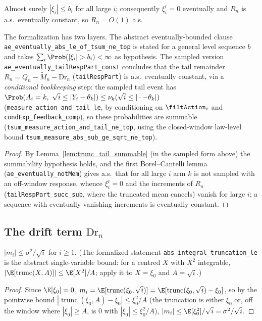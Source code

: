 \begin{lemma}\label{lem:trunc_tail_const}
\leanok
{}
Almost surely $|\xi_i|\le b_i$ for all large $i$; consequently $\xi_i^{\mathrm r}=0$ eventually and
$R_n$ is a.s.\ eventually constant, so $R_n=O(1)$ a.s.

The formalization has two layers. The abstract eventually-bounded clause
\texttt{ae\_eventually\_abs\_le\_of\_tsum\_ne\_top} is stated for a general level sequence $b$ and
takes $\sum_i\Prob(|\xi_i|>b_i)<\infty$ as hypothesis. The sampled version
\texttt{ae\_eventually\_tailRespPart\_const} concludes that the tail remainder
$R_n=Q_n-\tilde M_n-\mathrm{Dr}_n$ (\texttt{tailRespPart}) is a.s.\ eventually constant, via a
\emph{conditional bookkeeping} step: the sampled tail event has
$\Prob(A_i=k,\ \sqrt i\le|Y_i-\theta_k|)\le\nu_k(\sqrt i\le|\cdot-\theta_k|)$
(\texttt{measure\_action\_and\_tail\_le}, by conditioning on $\filtAction_i$ and
\texttt{condExp\_feedback\_comp}), so these probabilities are summable
(\texttt{tsum\_measure\_action\_and\_tail\_ne\_top}, using the closed-window law-level bound
\texttt{tsum\_measure\_abs\_sub\_ge\_sqrt\_ne\_top}).
\end{lemma}
\begin{proof}\leanok
{}
By Lemma~\ref{lem:trunc_tail_summable} (in the sampled form above) the summability hypothesis holds,
and the first Borel--Cantelli lemma (\texttt{ae\_eventually\_notMem}) gives a.s.\ that for all large
$i$ arm $k$ is not sampled with an off-window response, whence $\xi_i^{\mathrm r}=0$ and the
increments of $R_n$ (\texttt{tailRespPart\_succ\_sub}, where the truncated mean cancels) vanish for
large $i$; a sequence with eventually-vanishing increments is eventually constant.
\end{proof}

\subsection{The drift term $\mathrm{Dr}_n$}

\begin{lemma}\label{lem:trunc_mean_bound}
\leanok
{}
$|m_i|\le \sigma^2/\sqrt i$ for $i\ge1$. (The formalized statement
\texttt{abs\_integral\_truncation\_le} is the abstract single-variable bound: for a centred $X$
with $X^2$ integrable, $|\E[\operatorname{trunc}(X,A)]|\le \E[X^2]/A$; apply it to $X=\xi_0$ and
$A=\sqrt i$.)
\end{lemma}
\begin{proof}\leanok
Since $\E[\xi_0]=0$, $m_i=\E[\operatorname{trunc}(\xi_0,\sqrt i)]
=\E[\operatorname{trunc}(\xi_0,\sqrt i)-\xi_0]$, so by the pointwise bound
$|\operatorname{trunc}(\xi_0,A)-\xi_0|\le\xi_0^2/A$ (the truncation is either $\xi_0$ or, off the
window where $|\xi_0|\ge A$, is $0$ with $|\xi_0|\le\xi_0^2/A$),
$|m_i|\le\E[\xi_0^2]/\sqrt i=\sigma^2/\sqrt i$.
\end{proof}

